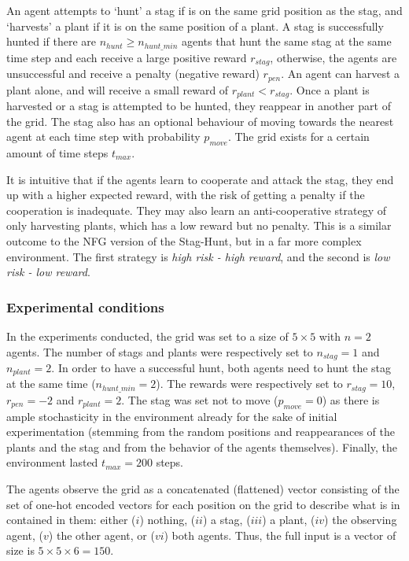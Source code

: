 An agent attempts to `hunt' a stag if is on the same grid position as the stag, and `harvests' a plant if it is on the same position of a plant. A stag is successfully hunted if there are $n_{hunt}\geq n_{hunt\_min}$ agents that hunt the same stag at the same time step and each receive a large positive reward $r_{stag}$, otherwise, the agents are unsuccessful and receive a penalty (negative reward) $r_{pen}$. An agent can harvest a plant alone, and will receive a small reward of $r_{plant}<r_{stag}$. Once a plant is harvested or a stag is attempted to be hunted, they reappear in another part of the grid. The stag also has an optional behaviour of moving towards the nearest agent at each time step with probability $p_{move}$. The grid exists for a certain amount of time steps $t_{max}$.

It is intuitive that if the agents learn to cooperate and attack the stag, they end up with a higher expected reward, with the risk of getting a penalty if the cooperation is inadequate. They may also learn an anti-cooperative strategy of only harvesting plants, which has a low reward but no penalty. This is a similar outcome to the NFG version of the Stag-Hunt, but in a far more complex environment. The first strategy is \textit{high risk - high reward}, and the second is \textit{low risk - low reward}.

\subsubsection{Experimental conditions}
In the experiments conducted, the grid was set to a size of $5\times5$ with $n=2$ agents. The number of stags and plants were respectively set to $n_{stag}=1$ and $n_{plant}=2$. In order to have a successful hunt, both agents need to hunt the stag at the same time ($n_{hunt\_min}=2$). The rewards were respectively set to $r_{stag}=10$, $r_{pen}=-2$ and $r_{plant}=2$. The stag was set not to move ($p_{move}=0$) as there is ample stochasticity in the environment already for the sake of initial experimentation (stemming from the random positions and reappearances of the plants and the stag and from the behavior of the agents themselves). Finally, the environment lasted $t_{max}=200$ steps.

The agents observe the grid as a concatenated (flattened) vector consisting of the set of one-hot encoded vectors for each position on the grid to describe what is in contained in them: either ($i$) nothing, ($ii$) a stag, ($iii$) a plant, ($iv$) the observing agent, ($v$) the other agent, or ($vi$) both agents. Thus, the full input is a vector of size is $5\times 5\times 6=150$.